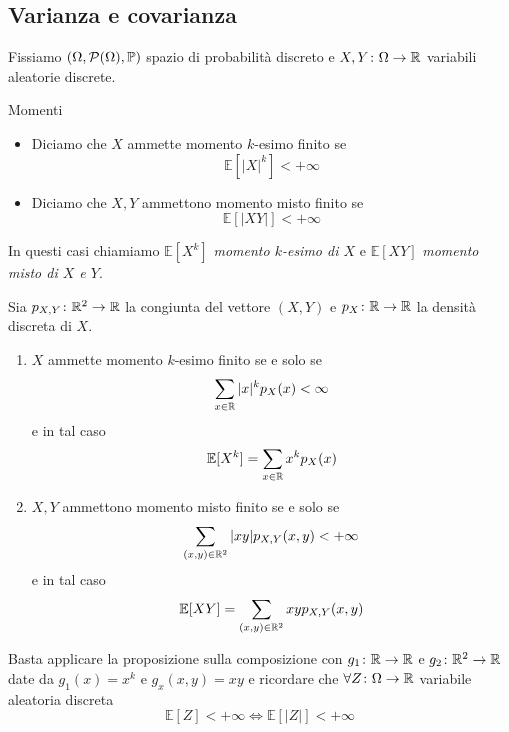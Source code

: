 \documentclass[a4paper]{article}
\begin{document}
\subsection{Varianza e covarianza}

Fissiamo \((\Omega, \mathcal P(\Omega), \mathbb P)\)
spazio di probabilità discreto e \(X,Y \colon \Omega \to \mathbb{R}\)
variabili aleatorie discrete.

\begin{snippetdefinition}{Momenti}
    \begin{itemize}
        \item Diciamo che \(X\) ammette momento \(k\)-esimo finito
            se \[
                \mathbb E[|X|^k] < +\infty
            \]
        \item Diciamo che \(X,Y\) ammettono momento
            misto finito se
            \[
                \mathbb E[|XY|] < +\infty
            \]
    \end{itemize}
    In questi casi chiamiamo \(\mathbb E[X^k]\)
    \emph{momento \(k\)-esimo di \(X\)}
    e \(\mathbb E[XY]\) \emph{momento misto di \(X\) e \(Y\)}.
\end{snippetdefinition}

\begin{snippetproposition}{}
    Sia \(p_{X,Y}\colon \mathbb{R}^2 \to \mathbb{R}\) la congiunta
    del vettore \((X,Y)\) e \(p_X \colon \mathbb{R} \to \mathbb{R}\)
    la densità discreta di \(X\).
    \begin{enumerate}
        \item \(X\) ammette momento \(k\)-esimo finito se e solo se
            \[
                \sum_{x\in\mathbb{R}} |x|^k p_X(x) < \infty
            \]
            e in tal caso
            \[
                \mathbb E[X^k] = \sum_{x\in\mathbb{R}} x^k p_X(x)
            \]
        \item \(X,Y\) ammettono momento misto finito se e solo se
            \[
                \sum_{(x,y) \in \mathbb{R}^2} |xy| p_{X,Y}(x,y) < +\infty
            \]
            e in tal caso
            \[
                \mathbb E[XY] = \sum_{(x,y) \in \mathbb{R}^2} xy p_{X,Y}(x,y)
            \]
    \end{enumerate}
\end{snippetproposition}

\begin{snippetproof}{}
    Basta applicare la proposizione sulla composizione %
    con \(g_1 \colon \mathbb{R} \to \mathbb{R}\)
    e \(g_2 \colon \mathbb{R}^2 \to \mathbb{R}\) date da
    \(g_1(x) = x^k\) e \(g_x(x,y) = xy\)
    e ricordare che \(\forall Z \colon \Omega \to \mathbb{R}\)
    variabile aleatoria discreta
    \[
        \mathbb E[Z] < +\infty \iff \mathbb E[|Z|] < +\infty
    \]
\end{snippetproof}
\end{document}
